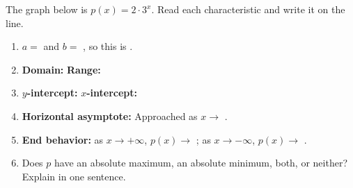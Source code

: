 \documentclass[10pt]{article}
\newcommand{\lgrid}[4]{%
  \draw[step=1, linegray!40, very thin] (#1,#3) grid (#2,#4);
  \draw[->, semithick, charcoal] (#1,0)--(#2,0) node[below right, font=\scriptsize]{$x$};
  \draw[->, semithick, charcoal] (0,#3)--(0,#4) node[left, font=\scriptsize]{$y$};}
\newcommand{\expcurve}[4]{\draw[very thick, forest, domain=#3:#4, samples=120, smooth]
  plot (\x,{#1*exp((#2)*(\x))});}
\begin{document}
\begin{practicebox}
The graph below is $p(x)=2\cdot 3^{x}$. Read each characteristic and write it on the line.
\begin{center}
\end{center}
\begin{enumerate}[leftmargin=1.7em, itemsep=3pt]
  \item $a=$ \blank{0.9cm} and $b=$ \blank{0.9cm}, so this is \blank{2.6cm}.
  \item \textbf{Domain:} \blank{3.0cm} \quad \textbf{Range:} \blank{3.0cm}
  \item \textbf{$y$-intercept:} \blank{1.8cm} \quad \textbf{$x$-intercept:} \blank{1.8cm}
  \item \textbf{Horizontal asymptote:} \blank{1.8cm} \quad Approached as $x\to$ \blank{1.4cm}.
  \item \textbf{End behavior:} as $x\to+\infty$, $p(x)\to$ \blank{1.2cm}; \; as $x\to-\infty$,
        $p(x)\to$ \blank{1.2cm}.
  \item Does $p$ have an absolute maximum, an absolute minimum, both, or neither?
        \blank{3.0cm} \\
        Explain in one sentence. \writeline
\end{enumerate}
\end{practicebox}
\end{document}
